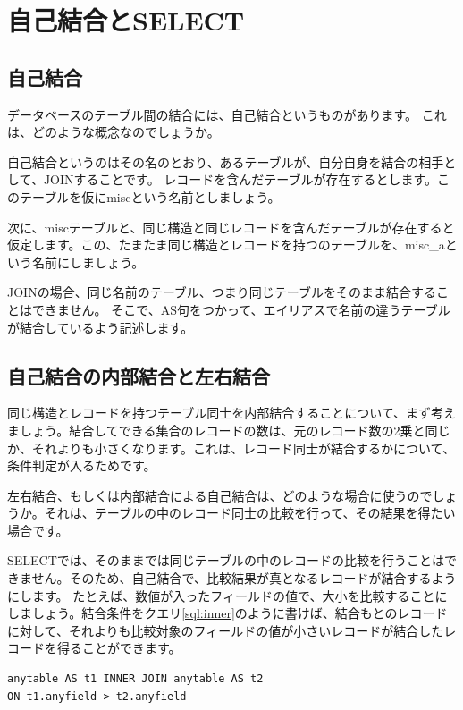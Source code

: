\chapter{自己結合とSELECT}

\section{自己結合}

データベースのテーブル間の結合には、自己結合というものがあります。
これは、どのような概念なのでしょうか。

自己結合というのはその名のとおり、あるテーブルが、自分自身を結合の相手として、JOINすることです。
レコードを含んだテーブルが存在するとします。このテーブルを仮にmiscという名前としましょう。

次に、miscテーブルと、同じ構造と同じレコードを含んだテーブルが存在すると仮定します。この、たまたま同じ構造とレコードを持つのテーブルを、misc\_aという名前にしましょう。

JOINの場合、同じ名前のテーブル、つまり同じテーブルをそのまま結合することはできません。
そこで、AS句をつかって、エイリアスで名前の違うテーブルが結合しているよう記述します。

\section{自己結合の内部結合と左右結合}

同じ構造とレコードを持つテーブル同士を内部結合することについて、まず考えましょう。結合してできる集合のレコードの数は、元のレコード数の2乗と同じか、それよりも小さくなります。これは、レコード同士が結合するかについて、条件判定が入るためです。

左右結合、もしくは内部結合による自己結合は、どのような場合に使うのでしょうか。それは、テーブルの中のレコード同士の比較を行って、その結果を得たい場合です。

SELECTでは、そのままでは同じテーブルの中のレコードの比較を行うことはできません。そのため、自己結合で、比較結果が真となるレコードが結合するようにします。
たとえば、数値が入ったフィールドの値で、大小を比較することにしましょう。結合条件をクエリ\ref{sql:inner}のように書けば、結合もとのレコードに対して、それよりも比較対象のフィールドの値が小さいレコードが結合したレコードを得ることができます。

\begin{lstlisting}[caption=自己結合の内部結合,label=sql:inner]
anytable AS t1 INNER JOIN anytable AS t2 
ON t1.anyfield > t2.anyfield
\end{lstlisting}


